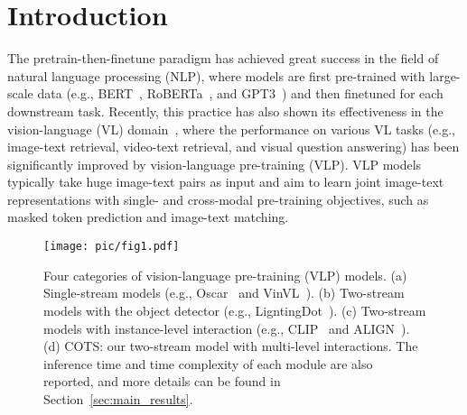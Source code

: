 \documentclass[10pt,twocolumn,letterpaper]{article}
\begin{document}
\vspace{-0.3cm}
\section{Introduction}
\label{sec:intro}
\vspace{-0.1cm}

The pretrain-then-finetune paradigm has achieved great success in the field of natural language processing (NLP), where models are first pre-trained with large-scale data (e.g., BERT~\cite{devlin2018bert}, RoBERTa~\cite{liu2019roberta}, and GPT3~\cite{brown2020language}) and then finetuned for each downstream task. Recently, this practice has also shown its effectiveness in the vision-language (VL) domain~\cite{li2020oscar, chen2020uniter, zhang2021vinvl, kim2021vilt, radford2021learning, jia2021scaling, huo2021wenlan}, where the performance on various VL tasks (e.g., image-text retrieval, video-text retrieval, and visual question answering) has been significantly improved by vision-language pre-training (VLP). VLP models typically take huge image-text pairs as input and aim to learn joint image-text representations with single- and cross-modal pre-training objectives, such as masked token prediction and image-text matching.

\begin{figure*}[t]
    \centering
    \texttt{[image: pic/fig1.pdf]}
    \vspace{-0.12in}
    \caption{
    Four categories of vision-language pre-training (VLP) models. (a) Single-stream models (e.g., Oscar~\cite{li2020oscar} and VinVL~\cite{zhang2021vinvl}). (b) Two-stream models with the object detector (e.g.,  LigntingDot~\cite{sun2021lightningdot}). (c) Two-stream models with instance-level interaction (e.g., CLIP~\cite{radford2021learning} and ALIGN~\cite{jia2021scaling}). (d) COTS: our two-stream model with multi-level interactions. The inference time and time complexity of each module are also reported, and more details can be found in Section~\ref{sec:main_results}.
    }
    \label{fig:vlm_comp}
    \vspace{-0.1in}
\end{figure*}
\end{document}
